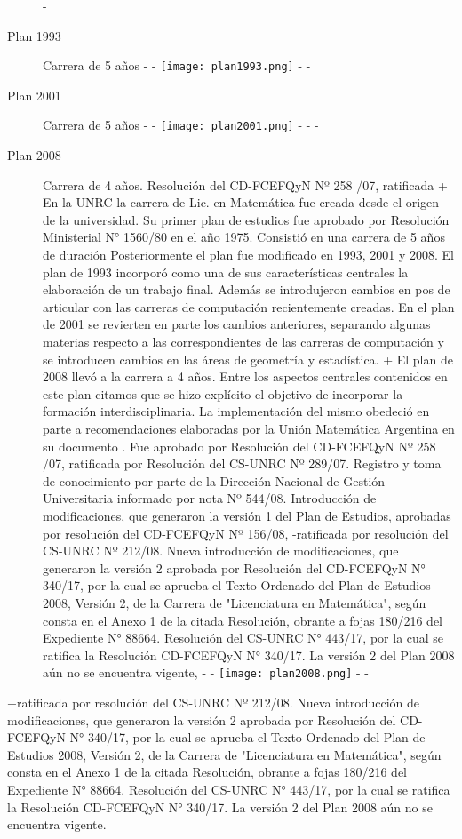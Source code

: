 \begin{description}
-\item[Plan 1993] Carrera de 5 años
-
- \texttt{[image: plan1993.png]}
-
-\item[Plan 2001] Carrera de 5 años
-
- \texttt{[image: plan2001.png]}
-
-
-\item[Plan 2008] Carrera de 4 años. Resolución del CD-FCEFQyN Nº 258 /07, ratificada 
+ En la UNRC la carrera de Lic. en Matemática fue creada desde el origen de la universidad. Su primer plan de estudios fue aprobado por Resolución Ministerial  N° 1560/80 en el año 1975. Consistió en una carrera de 5 años de duración Posteriormente el plan fue modificado en 1993, 2001 y 2008. El plan de 1993 incorporó como una de sus características centrales la elaboración de un trabajo final. Además se introdujeron cambios en pos de articular con las carreras de computación recientemente creadas.  En el plan de 2001 se revierten en parte los cambios anteriores, separando algunas  materias respecto a las correspondientes de las carreras de  computación y se introducen cambios en las áreas de geometría y estadística.  
+ El plan de  2008 llevó a la carrera a 4 años. Entre los aspectos centrales contenidos en este plan citamos que se hizo explícito el objetivo de incorporar la formación interdisciplinaria. La implementación del mismo obedeció en parte a recomendaciones elaboradas por la Unión Matemática Argentina en su documento \cite{uma}.  Fue aprobado por Resolución del CD-FCEFQyN Nº 258 /07, ratificada 
 por Resolución del CS-UNRC Nº 289/07. Registro y toma de conocimiento 
 por parte de la Dirección Nacional de Gestión Universitaria informado por nota 
 Nº 544/08. Introducción de modificaciones, que generaron la versión 1 del Plan 
 de Estudios, aprobadas por resolución del CD-FCEFQyN Nº 156/08, 
-ratificada por resolución del CS-UNRC Nº 212/08.  Nueva introducción de modificaciones, que generaron la versión 2 aprobada por Resolución del CD-FCEFQyN N° 340/17, por la cual se aprueba el Texto Ordenado del Plan de Estudios 2008, Versión 2, de la Carrera de "Licenciatura en Matemática", según consta en el Anexo 1 de la citada Resolución, obrante a fojas 180/216 del Expediente N° 88664.  Resolución del CS-UNRC N° 443/17, por la cual se ratifica la Resolución  CD-FCEFQyN N° 340/17.  La versión 2 del Plan 2008 aún no se encuentra vigente,
-
- \texttt{[image: plan2008.png]}
-
-\end{description}
+ratificada por resolución del CS-UNRC Nº 212/08.  Nueva introducción de modificaciones, que generaron la versión 2 aprobada por Resolución del CD-FCEFQyN N° 340/17, por la cual se aprueba el Texto Ordenado del Plan de Estudios 2008, Versión 2, de la Carrera de "Licenciatura en Matemática", según consta en el Anexo 1 de la citada Resolución, obrante a fojas 180/216 del Expediente N° 88664.  Resolución del CS-UNRC N° 443/17, por la cual se ratifica la Resolución  CD-FCEFQyN N° 340/17.  La versión 2 del Plan 2008 aún no se encuentra vigente. 
 
